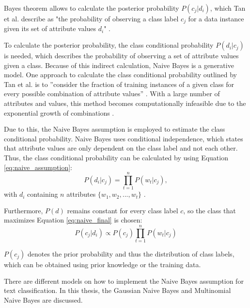         Bayes theorem allows to calculate the posterior probability $P(c_j|d_i)$, which Tan et al. describe as "the probability of observing a class label $c_j$ for a data instance given its set of attribute values $d_i$" \cite[p.~418]{DBLP:books/aw/TanSKK2019}. 

        To calculate the posterior probability, the class conditional probability $P(d_i|c_j)$ is needed, which describes the probability of observing a set of attribute values given a class. Because of this indirect calculation, Naive Bayes is a generative model. One approach to calculate the class conditional probability outlined by Tan et al. is to ''consider the fraction of training instances of a given class for every possible combination of attribute values'' \cite[p.~419]{DBLP:books/aw/TanSKK2019}. With a large number of attributes and values, this method becomes computationally infeasible due to the exponential growth of combinations \cite{DBLP:books/aw/TanSKK2019}.

        Due to this, the Naive Bayes assumption is employed to estimate the class conditional probability. Naive Bayes uses conditional independence, which states that attribute values are only dependent on the class label and not each other. Thus, the class conditional probability can be calculated by using Equation \eqref{eq:naive_assumption}:
        \begin{equation}
            \label{eq:naive_assumption}
            P(d_i|c_j) = \prod_{t=1}^{n}P(w_{t}|c_j),
        \end{equation}
        with $d_i$ containing $n$ attributes $\{w_1,w_2,...,w_t\}$ \cite{DBLP:books/aw/TanSKK2019}.

        Furthermore, $P(d)$ remains constant for every class label $c$, so the class that maximizes Equation \eqref{eq:naive_final} is chosen: 
        \begin{equation}
            \label{eq:naive_final}
            P(c_j|d_i)\propto P(c_j)\prod_{t=1}^{n}P(w_{t}|c_j) 
        \end{equation}   
        
        $P(c_j)$ denotes the prior probability and thus the distribution of class labels, which can be obtained using prior knowledge or the training data.
        
        There are different models on how to implement the Naive Bayes assumption for text classification. In this thesis, the Gaussian Naive Bayes and Multinomial Naive Bayes are discussed. 
        
